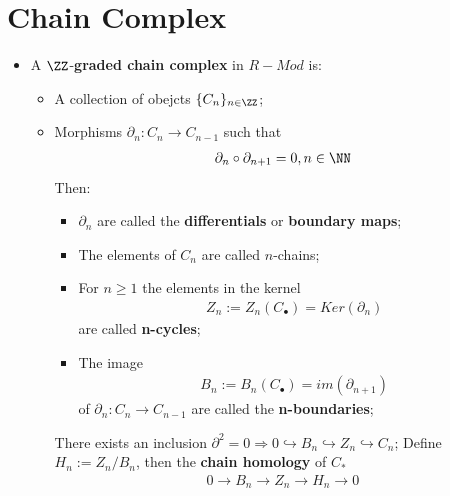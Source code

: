 \documentclass[Total.tex]{subfiles}
\begin{document}
			\section{Chain Complex}
				\begin{Def}
					\begin{itemize}
						\item A $\ZZ$-\textbf{graded chain complex} in $R-Mod$ is:
						\begin{itemize}
							\item A collection of obejcts $\{C_n\}_{n\in \ZZ}$;
							\item Morphisms $\partial_n:C_n\rightarrow C_{n-1}$ such that
							\begin{gather*}
								\partial_n\circ \partial_{n+1}=0,n\in \NN
							\end{gather*}
							Then:
							\begin{itemize}
								\item $\partial_n$ are called the \textbf{differentials} or \textbf{boundary maps};
								\item The elements of $C_n$ are called $n$-chains;
								\item For $n\geq 1$ the elements in the kernel
								\begin{gather*}
									Z_n:=Z_n(C_\bullet)=Ker(\partial_{n})
								\end{gather*}
								are called \textbf{n-cycles};
								\item The image
								\begin{gather*}
									B_n:=B_n(C_\bullet)=im(\partial_{n+1})
								\end{gather*}
								of $\partial_n:C_{n}\rightarrow C_{n-1}$ are called the \textbf{n-boundaries};
							\end{itemize}
							There exists an inclusion $\partial^2=0\Rightarrow 0\hookrightarrow B_n\hookrightarrow Z_n\hookrightarrow C_n$; Define $H_n:=Z_n/B_n$, then the \textbf{chain homology} of $C_*$
							\begin{gather*}
								0\rightarrow B_n\rightarrow Z_n\rightarrow H_n\rightarrow 0
							\end{gather*}
						\end{itemize}
					\end{itemize}
				\end{Def}
				
\end{document}

